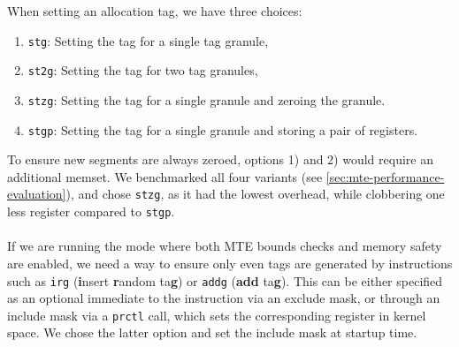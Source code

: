 When setting an allocation tag, we have three choices:
\begin{enumerate}
  \item \texttt{stg}: Setting the tag for a single tag granule,
  \item \texttt{st2g}: Setting the tag for two tag granules,
  \item \texttt{stzg}: Setting the tag for a single granule and zeroing the granule.
  \item \texttt{stgp}: Setting the tag for a single granule and storing a pair of registers.
\end{enumerate}

To ensure new segments are always zeroed, options 1) and 2) would require an additional memset.
We benchmarked all four variants (see \cref{sec:mte-performance-evaluation}), and chose \texttt{stzg}, as it had the lowest overhead, while clobbering one less register compared to \texttt{stgp}.

\paragraph{}
If we are running the mode where both \ac{MTE} bounds checks and memory safety are enabled, we need a way to ensure only even tags are generated by instructions such as \texttt{irg} (\textbf{i}nsert \textbf{r}andom ta\textbf{g}) or \texttt{addg} (\textbf{add} ta\textbf{g}).
This can be either specified as an optional immediate to the instruction via an exclude mask, or through an include mask via a \texttt{prctl} call, which sets the corresponding register in kernel space.
We chose the latter option and set the include mask at startup time.


